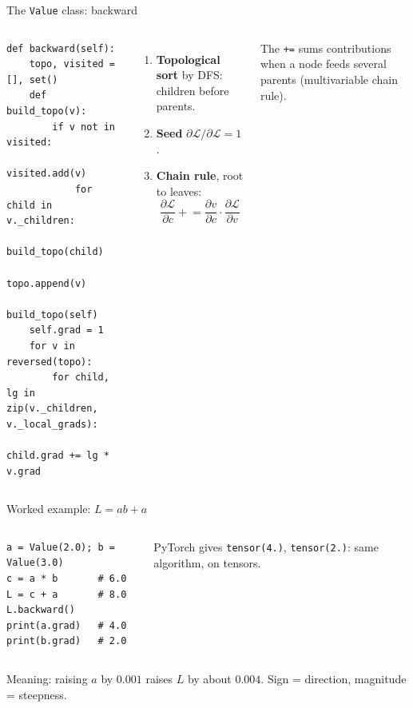 \documentclass[aspectratio=169,11pt]{beamer}
\newcommand{\dd}[2]{\frac{\partial #1}{\partial #2}}
\begin{document}
\begin{frame}[fragile]{The \texttt{Value} class: backward}
\begin{columns}
\begin{lstlisting}
def backward(self):
    topo, visited = [], set()
    def build_topo(v):
        if v not in visited:
            visited.add(v)
            for child in v._children:
                build_topo(child)
            topo.append(v)
    build_topo(self)
    self.grad = 1
    for v in reversed(topo):
        for child, lg in zip(v._children, v._local_grads):
            child.grad += lg * v.grad
\end{lstlisting}
\begin{enumerate}
  \item \textbf{Topological sort} by DFS: children before parents.
  \item \textbf{Seed} $\partial\mathcal L/\partial\mathcal L = 1$.
  \item \textbf{Chain rule}, root to leaves:
  \[\dd{\mathcal L}{c} \mathrel{+}= \dd{v}{c}\cdot\dd{\mathcal L}{v}\]
\end{enumerate}
The \texttt{+=} sums contributions when a node feeds several parents (multivariable chain rule).
\end{columns}
\end{frame}

\begin{frame}[fragile]{Worked example: $L = ab + a$}
\begin{columns}
\begin{lstlisting}
a = Value(2.0); b = Value(3.0)
c = a * b       # 6.0
L = c + a       # 8.0
L.backward()
print(a.grad)   # 4.0
print(b.grad)   # 2.0
\end{lstlisting}
PyTorch gives \texttt{tensor(4.)}, \texttt{tensor(2.)}: same algorithm, on tensors.
\centering
{}
\end{columns}
\vfill
Meaning: raising $a$ by $0.001$ raises $L$ by about $0.004$. Sign = direction, magnitude = steepness.
\end{frame}
\end{document}
